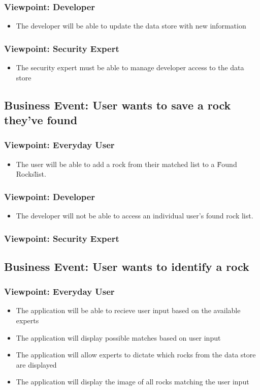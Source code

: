 \documentclass[titlepage]{article}
\begin{document}
  \subsubsection {Viewpoint: Developer}
    \begin{itemize}
      \item The developer will be able to update the data store with new information
    \end{itemize}
  \subsubsection {Viewpoint: Security Expert}
    \begin{itemize}
      \item The security expert must be able to manage developer access to the data store
    \end{itemize}
\subsection {Business Event: User wants to save a rock they've found}
  \subsubsection {Viewpoint: Everyday User}
    \begin{itemize}
      \item The user will be able to add a rock from their matched list to a \"Found Rocks\" list.
    \end{itemize}
  \subsubsection {Viewpoint: Developer}
    \begin{itemize}
      \item The developer will not be able to access an individual user's found rock list.
    \end{itemize}
  \subsubsection {Viewpoint: Security Expert}
\subsection{Business Event: User wants to identify a rock}
  \subsubsection {Viewpoint: Everyday User}
    \begin{itemize}
      \item The application will be able to recieve user input based on the available experts
      \item The application will display possible matches based on user input
      \item The application will allow experts to dictate which rocks from the data store are displayed
      \item The application will display the image of all rocks matching the user input
    \end{itemize}
\end{document}
